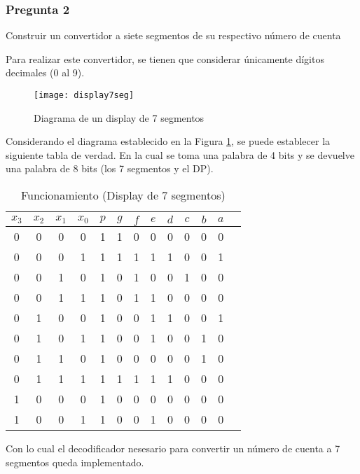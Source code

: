 \documentclass[../procedimientos.tex]{subfiles}
\begin{document}
\subsubsection*{Pregunta 2}
\begin{em}
  Construir un convertidor a siete segmentos de su respectivo número de cuenta
\end{em}

Para realizar este convertidor, se tienen que considerar únicamente dígitos 
decimales (0 al 9).
\begin{figure}[H]
  \centering
  \texttt{[image: display7seg]}
  \caption{Diagrama de un display de 7 segmentos}
  \label{fig:display7seg}
\end{figure}

Considerando el diagrama establecido en la Figura \ref{fig:display7seg}, se 
puede establecer la siguiente tabla de verdad. En la cual se toma una palabra 
de 4 bits y se devuelve una palabra de 8 bits (los 7 segmentos y el DP).
\begin{table}[H]
  \centering
  \begin{tabular}{cccc|ccccccccc}
    \hline
    $x_3$ & $x_2$ & $x_1$ & $x_0$ & $p$ & $g$ & $f$ & $e$ & $d$ & $c$ & $b$ & $a$\\
    \hline
    0 & 0 & 0 & 0 & 1 & 1 & 0 & 0 & 0 & 0 & 0 & 0\\
    0 & 0 & 0 & 1 & 1 & 1 & 1 & 1 & 1 & 0 & 0 & 1\\
    0 & 0 & 1 & 0 & 1 & 0 & 1 & 0 & 0 & 1 & 0 & 0\\
    0 & 0 & 1 & 1 & 1 & 0 & 1 & 1 & 0 & 0 & 0 & 0\\
    0 & 1 & 0 & 0 & 1 & 0 & 0 & 1 & 1 & 0 & 0 & 1\\
    0 & 1 & 0 & 1 & 1 & 0 & 0 & 1 & 0 & 0 & 1 & 0\\
    0 & 1 & 1 & 0 & 1 & 0 & 0 & 0 & 0 & 0 & 1 & 0\\
    0 & 1 & 1 & 1 & 1 & 1 & 1 & 1 & 1 & 0 & 0 & 0\\
    1 & 0 & 0 & 0 & 1 & 0 & 0 & 0 & 0 & 0 & 0 & 0\\
    1 & 0 & 0 & 1 & 1 & 0 & 0 & 1 & 0 & 0 & 0 & 0
  \end{tabular}
  \caption{Funcionamiento (Display de 7 segmentos)}
  \label{tab:previo2_func}
\end{table}

Con lo cual el decodificador nesesario para convertir un número de cuenta a 7 
segmentos queda implementado.
\end{document}
